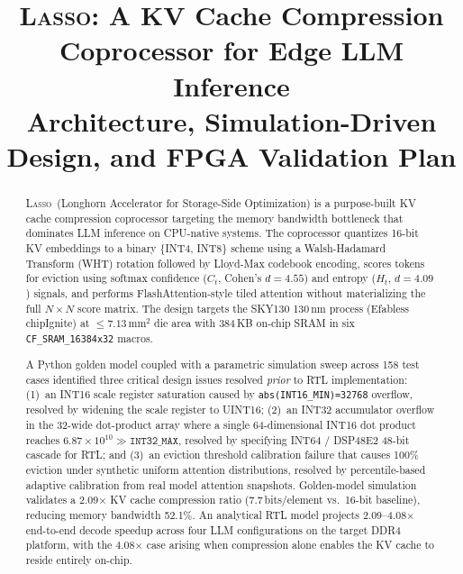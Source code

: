 \documentclass[conference]{IEEEtran}
\newcommand{\lasso}{\textsc{Lasso}}
\begin{document}
\title{\lasso: A KV Cache Compression Coprocessor for Edge LLM Inference\\
\large Architecture, Simulation-Driven Design, and FPGA Validation Plan}

\author{
}

\maketitle

\begin{abstract}
\lasso\ (Longhorn Accelerator for Storage-Side Optimization) is a
purpose-built KV cache compression coprocessor targeting the memory
bandwidth bottleneck that dominates LLM inference on CPU-native
systems. The coprocessor quantizes 16-bit KV embeddings to a binary
\{INT4, INT8\} scheme using a Walsh-Hadamard Transform (WHT) rotation
followed by Lloyd-Max codebook encoding, scores tokens for eviction
using softmax confidence ($C_t$, Cohen's $d{=}4.55$) and entropy
($H_t$, $d{=}4.09$) signals, and performs FlashAttention-style tiled
attention without materializing the full $N{\times}N$ score matrix.
The design targets the SKY130 130\,nm process (Efabless chipIgnite)
at ${\le}7.13\,\text{mm}^2$ die area with 384\,KB on-chip SRAM in
six \texttt{CF\_SRAM\_16384x32} macros.

A Python golden model coupled with a parametric simulation sweep
across 158 test cases identified three critical design issues resolved
\emph{prior} to RTL implementation: (1)~an INT16 scale register
saturation caused by \texttt{abs(INT16\_MIN)=32768} overflow, resolved
by widening the scale register to UINT16; (2)~an INT32 accumulator
overflow in the 32-wide dot-product array where a single
64-dimensional INT16 dot product reaches $6.87{\times}10^{10} \gg
\texttt{INT32\_MAX}$, resolved by specifying INT64 / DSP48E2 48-bit
cascade for RTL; and (3)~an eviction threshold calibration failure
that causes 100\% eviction under synthetic uniform attention
distributions, resolved by percentile-based adaptive calibration from
real model attention snapshots. Golden-model simulation validates a 2.09$\times$ KV cache compression
ratio (7.7\,bits/element vs.\ 16-bit baseline), reducing memory
bandwidth 52.1\%. An analytical RTL model projects 2.09--4.08$\times$
end-to-end decode speedup across four LLM configurations on the target
DDR4 platform, with the 4.08$\times$ case arising when compression
alone enables the KV cache to reside entirely on-chip.
\end{abstract}
\end{document}
